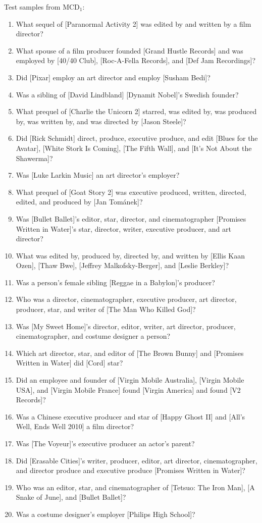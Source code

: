 \documentclass[letterpaper]{article}
\newcommand{\MCD}[1]{MCD$_{#1}$}
\begin{document}
Test samples from \MCD{1}:
\begin{enumerate}
  \item What sequel of [Paranormal Activity 2] was edited by and written by a film director?
  \item What spouse of a film producer founded [Grand Hustle Records] and was employed by [40/40 Club], [Roc-A-Fella Records], and [Def Jam Recordings]?
  \item Did [Pixar] employ an art director and employ [Susham Bedi]?
  \item Was a sibling of [David Lindbland] [Dynamit Nobel]'s Swedish founder?
  \item What prequel of [Charlie the Unicorn 2] starred, was edited by, was produced by, was written by, and was directed by [Jason Steele]?
  \item Did [Rick Schmidt] direct, produce, executive produce, and edit [Blues for the Avatar], [White Stork Is Coming], [The Fifth Wall], and [It's Not About the Shawerma]?
  \item Was [Luke Larkin Music] an art director's employer?
  \item What prequel of [Goat Story 2] was executive produced, written, directed, edited, and produced by [Jan Tom\'anek]?
  \item Was [Bullet Ballet]'s editor, star, director, and cinematographer [Promises Written in Water]'s star, director, writer, executive producer, and art director?
  \item What was edited by, produced by, directed by, and written by [Ellis Kaan Ozen], [Thaw Bwe], [Jeffrey Malkofsky-Berger], and [Leslie Berkley]?
  \item Was a person's female sibling [Reggae in a Babylon]'s producer?
  \item Who was a director, cinematographer, executive producer, art director, producer, star, and writer of [The Man Who Killed God]?
  \item Was [My Sweet Home]'s director, editor, writer, art director, producer, cinematographer, and costume designer a person?
  \item Which art director, star, and editor of [The Brown Bunny] and [Promises Written in Water] did [Cord] star?
  \item Did an employee and founder of [Virgin Mobile Australia], [Virgin Mobile USA], and [Virgin Mobile France] found [Virgin America] and found [V2 Records]?
  \item Was a Chinese executive producer and star of [Happy Ghost II] and [All's Well, Ends Well 2010] a film director?
  \item Was [The Voyeur]'s executive producer an actor's parent?
  \item Did [Erasable Cities]'s writer, producer, editor, art director, cinematographer, and director produce and executive produce [Promises Written in Water]?
  \item Who was an editor, star, and cinematographer of [Tetsuo: The Iron Man], [A Snake of June], and [Bullet Ballet]?
  \item Was a costume designer's employer [Philips High School]?
\end{enumerate}
\end{document}
